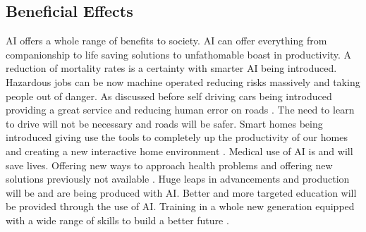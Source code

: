 \documentclass[conference]{IEEEtran}
\begin{document}
\subsection{Beneficial Effects}
AI offers a whole range of benefits to society. AI can offer everything from companionship to life saving solutions to unfathomable boast in productivity. A reduction of mortality rates is a certainty with smarter AI being introduced. Hazardous jobs can be now machine operated reducing risks massively and taking people out of danger. As discussed before self driving cars being introduced providing a great service and reducing human error on roads \cite{Trolley Problem}. The need to learn to drive will not be necessary and roads will be safer. Smart homes being introduced giving use the tools to completely up the productivity of our homes and creating a new interactive home environment \cite{SmartHome}. Medical use of AI is and will save lives. Offering new ways to approach health problems and offering new solutions previously not available \cite{atRisk}. Huge leaps in advancements and production will be and are being produced with AI. Better and more targeted education will be provided through the use of AI. Training in a whole new generation equipped with a wide range of skills to build a better future \cite{Education}. 
\end{document}
